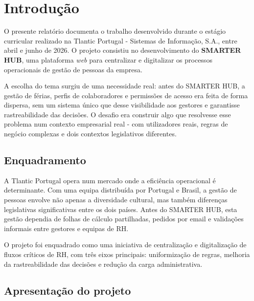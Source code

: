 \documentclass[12pt, a4paper, twoside, openright]{report}
\newcommand{\mainmatter}{\pagenumbering{arabic}}
\begin{document}
\mainmatter
\pagestyle{fancy}

\chapter{Introdução}
\label{cap:introducao}

O presente relatório documenta o trabalho desenvolvido durante o estágio curricular realizado
na Tlantic Portugal - Sistemas de Informação, S.A., entre abril e junho de 2026. O projeto
consistiu no desenvolvimento do \textbf{SMARTER HUB}, uma plataforma \textit{web} para
centralizar e digitalizar os processos operacionais de gestão de pessoas da empresa.

A escolha do tema surgiu de uma necessidade real: antes do SMARTER HUB, a gestão de
férias, perfis de colaboradores e permissões de acesso era feita de forma dispersa, sem
um sistema único que desse visibilidade aos gestores e garantisse rastreabilidade das
decisões. O desafio era construir algo que resolvesse esse problema num contexto
empresarial real - com utilizadores reais, regras de negócio complexas e dois contextos
legislativos diferentes.

\section{Enquadramento}

A Tlantic Portugal opera num mercado onde a eficiência operacional é determinante.
Com uma equipa distribuída por Portugal e Brasil, a gestão de pessoas envolve não apenas
a diversidade cultural, mas também diferenças legislativas significativas entre os dois países.
Antes do SMARTER HUB, esta gestão dependia de folhas de cálculo partilhadas, pedidos
por email e validações informais entre gestores e equipas de RH.

O projeto foi enquadrado como uma iniciativa de centralização e digitalização de fluxos
críticos de RH, com três eixos principais: uniformização de regras, melhoria da
rastreabilidade das decisões e redução da carga administrativa.

\section{Apresentação do projeto}
\end{document}

